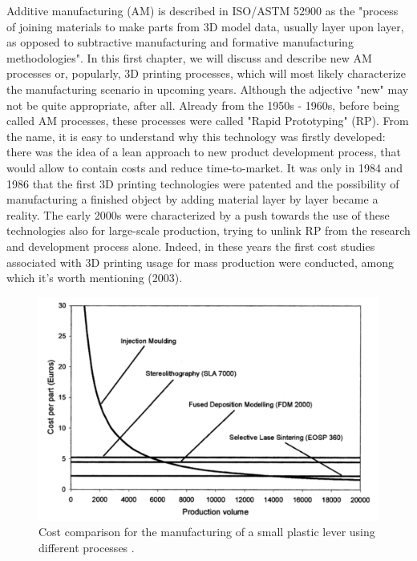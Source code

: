 Additive manufacturing (AM) is described in ISO/ASTM 52900 \cite{international_standard_organization_isoastm_2015} as the "process of joining materials to make parts from 3D model data, usually layer upon layer, as opposed to subtractive manufacturing and formative manufacturing methodologies".
In this first chapter, we will discuss and describe new AM processes or, popularly, 3D printing processes, which will most likely characterize the manufacturing scenario in upcoming years. Although the adjective "new" may not be quite appropriate, after all. Already from the 1950s - 1960s, before being called AM processes, these processes were called "Rapid Prototyping" (RP). From the name, it is easy to understand why this technology was firstly developed: there was the idea of a lean approach to new product development process, that would allow to contain costs and reduce time-to-market. It was only in 1984 and 1986 that the first 3D printing technologies were patented and the possibility of manufacturing a finished object by adding material layer by layer became a reality. The early 2000s were characterized by a push towards the use of these technologies also for large-scale production, trying to unlink RP from the research and development process alone. Indeed, in these years the first cost studies associated with 3D printing usage for mass production were conducted, among which it's worth mentioning \citeauthor{hopkinson_analysis_2003} (2003). 
\begin{figure}[H]
    \centering
    \includegraphics[width=0.55 \textwidth]{Images/costs.png}
    \caption[Traditional processes vs AM costs.]{Cost comparison for the manufacturing of a small plastic lever using different processes \cite{hopkinson_analysis_2003}.}
    \label{fig:costs}
\end{figure}
